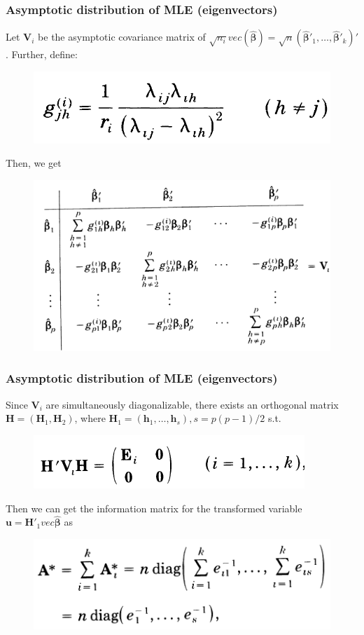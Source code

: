 \documentclass{beamer}
\begin{document}
	
	\begin{frame}
		\frametitle{Asymptotic distribution of MLE (eigenvectors)}
		Let $\bm{V}_i$ be the asymptotic covariance matrix of $\sqrt{n_i}vec(\hat{\bm{\beta}}) = \sqrt{n}(\hat{\bm{\beta}}'_1,\ldots,\hat{\bm{\beta}}'_k)'$. Further, define:
		\begin{figure}
			\includegraphics[width=0.4\linewidth]{image005.png}
		\end{figure}
		Then, we get
		\begin{figure}
			\includegraphics[width=0.7\linewidth]{image006.png}
		\end{figure}
	\end{frame}
	
	
	\begin{frame}
		\frametitle{Asymptotic distribution of MLE (eigenvectors)}
		Since $\bm{V}_i$ are simultaneously diagonalizable, there exists an orthogonal matrix $\bm{H} = (\bm{H}_1, \bm{H}_2)$, where $\bm{H}_1=(\bm{h}_1,\ldots,\bm{h}_s), s=p(p-1)/2$ s.t.
		\begin{figure}
			\includegraphics[width=0.5\linewidth]{image007.png}
		\end{figure}
		Then we can get the information matrix for the transformed variable $\bm{u} = \bm{H}'_1 vec \hat{\bm{\beta}}$ as
		\begin{figure}
			\includegraphics[width=0.5\linewidth]{image008.png}
		\end{figure}
	\end{frame}
	
\end{document}

